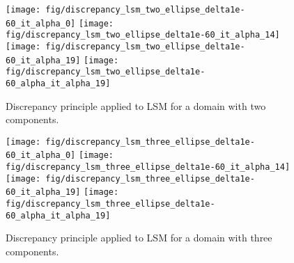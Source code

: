 \documentclass[10pt, a4paper, twoside, openright]{book}
\theoremstyle{definition}
\theoremstyle{plain}
\theoremstyle{plain}
\theoremstyle{plain}
\theoremstyle{plain}
\theoremstyle{plain}
\theoremstyle{plain}
\theoremstyle{plain}
\theoremstyle{plain}
\begin{document}
\begin{center}
\begin{figure}
{
\texttt{[image: fig/discrepancy\_lsm\_two\_ellipse\_delta1e-60\_it\_alpha\_0]}
}
{
\texttt{[image: fig/discrepancy\_lsm\_two\_ellipse\_delta1e-60\_it\_alpha\_14]}
}
\\ 
{
\texttt{[image: fig/discrepancy\_lsm\_two\_ellipse\_delta1e-60\_it\_alpha\_19]}
}
{
\texttt{[image: fig/discrepancy\_lsm\_two\_ellipse\_delta1e-60\_alpha\_it\_alpha\_19]}
}
\caption{Discrepancy principle applied to LSM for a domain with two components.}
\label{fig:discrepancy_two_ellipse}
\end{figure}
\end{center}

\begin{center}
\begin{figure}%
{
\texttt{[image: fig/discrepancy\_lsm\_three\_ellipse\_delta1e-60\_it\_alpha\_0]}
}
{
\texttt{[image: fig/discrepancy\_lsm\_three\_ellipse\_delta1e-60\_it\_alpha\_14]}
}
\\
{
\texttt{[image: fig/discrepancy\_lsm\_three\_ellipse\_delta1e-60\_it\_alpha\_19]}
}
{
\texttt{[image: fig/discrepancy\_lsm\_three\_ellipse\_delta1e-60\_alpha\_it\_alpha\_19]}
}
\caption{Discrepancy principle applied to LSM for a domain with three components.}
\label{fig:discrepancy_three_ellipse}
\end{figure}
\end{center}

\end{document}
